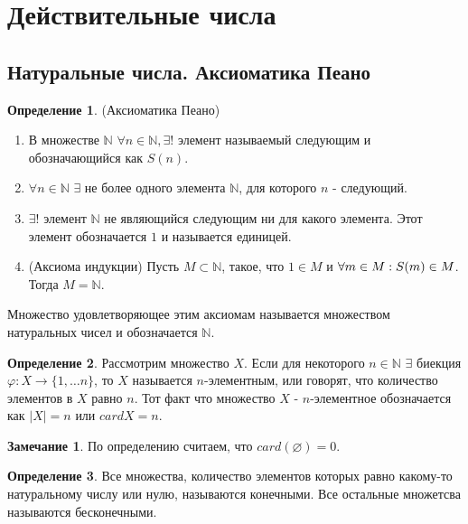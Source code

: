 \documentclass[a4paper, 12pt]{article}
\newcommand{\N}{\mathbb{N}}
\renewcommand{\phi}{\varphi}
\renewcommand{\emptyset}{\varnothing}
\theoremstyle{definition}
\newtheorem*{definition}{Определение}
\newtheorem*{comm}{Замечание}
\begin{document}
    \section{Действительные числа}
    \subsection{Натуральные числа. Аксиоматика Пеано}
        \begin{definition} (Аксиоматика Пеано)
            \begin{enumerate}
                \item В множестве $\N$ $\forall n\in \N, \exists !$ элемент называемый следующим и обозначающийся как $S(n)$.
                \item $\forall n\in \N$ $\exists$ не более одного элемента $\N$, для которого $n$ - следующий.
                \item $\exists !$ элемент $\N$ не являющийся следующим ни для какого элемента. Этот элемент обозначается $1$ и называется единицей.
                \item (Аксиома индукции) Пусть $M\subset \N$, такое, что $1\in M$ и $\forall m\in M:\\ S(m)\in M$. Тогда $M=\N$.
            \end{enumerate}
        Множество удовлетворяющее этим аксиомам называется множеством натуральных чисел и обозначается $\N$.
        \end{definition}
        \begin{definition}
            Рассмотрим  множество $X$. Если для некоторого $n\in \N$ $\exists$ биекция $\phi: X\to \{1, \dots n\}$, то $X$ называется $n$-элементным, или говорят, что количество элементов в $X$ равно $n$. Тот факт что множество $X$ - $n$-элементное обозначается как $|X|=n$ или $cardX=n$.
        \end{definition} 
        \begin{comm}
            По определению считаем, что $card(\emptyset) =0$.
        \end{comm}
        \begin{definition}
            Все множества, количество элементов которых равно какому-то натуральному числу или нулю, называются конечными. Все остальные множетсва называются бесконечными.
        \end{definition}
\end{document}
